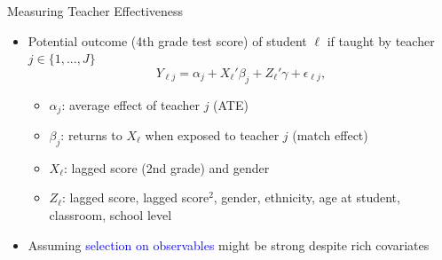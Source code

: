 \documentclass[compress,10pt,aspectratio=169]{beamer}
\newcommand\emphblue[1]{\textcolor{blue}{#1}}
\begin{document}
\begin{frame}{Measuring Teacher Effectiveness}
    \begin{itemize}
        \item Potential outcome (4th grade test score) of student $\ell$ if taught by teacher $j\in\{1,...,J\}$
        $$
        Y_{\ell j}=\alpha_j+X_{\ell}'\beta_j+Z_{\ell}'\gamma+\epsilon_{\ell j},
        $$
        \begin{itemize}
        \item[$\Rightarrow$] $\alpha_j$: average effect of teacher $j$ (ATE)
        \medskip
        \item[$\Rightarrow$] $\beta_j$: returns to $X_{\ell}$ when exposed to teacher $j$ (match effect)
        \medskip
        \item[$\Rightarrow$] $X_{\ell}$: lagged score (2nd grade) and gender
        \medskip
        \item[$\Rightarrow$] $Z_{\ell}$: lagged score, lagged score$^2$, gender, ethnicity, age at student, classroom, school level
        \end{itemize}
        \bigskip
        \item Assuming \emphblue{selection on observables} might be strong despite rich covariates
    \end{itemize}
\end{frame}
\end{document}
